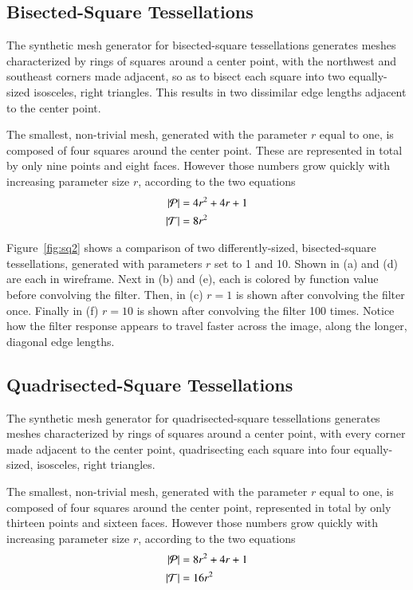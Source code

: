%
%
%
%
\pagebreak
\subsection{Bisected-Square Tessellations}
\label{ch6sSTDDssBST}
The synthetic mesh generator for bisected-square tessellations generates meshes characterized by rings of squares around a center point, with the northwest and southeast corners made adjacent, so as to bisect each square into two equally-sized isosceles, right triangles. This results in two dissimilar edge lengths adjacent to the center point.

The smallest, non-trivial mesh, generated with the parameter $r$ equal to one, is composed of four squares around the center point. These are represented in total by only nine points and eight faces. However those numbers grow quickly with increasing parameter size $r$, according to the two equations
\begin{align}
	|\mathcal{P}| &= 4r^2 + 4r + 1 \\
	|\mathcal{T}| &= 8r^2
	\label{eq:sq2PointAndFaceCounts}
\end{align}

Figure~\ref{fig:sq2} shows a comparison of two differently-sized, bisected-square tessellations, generated with parameters $r$ set to 1 and 10. Shown in (a) and (d) are each in wireframe. Next in (b) and (e), each is colored by function value before convolving the filter. Then, in (c) $r=1$ is shown after convolving the filter once. Finally in (f) $r=10$ is shown after convolving the filter 100 times. Notice how the filter response appears to travel faster across the image, along the longer, diagonal edge lengths.



%
%
%
%
\pagebreak
\subsection{Quadrisected-Square Tessellations}
\label{ch6sSTDDssQST}
The synthetic mesh generator for quadrisected-square tessellations generates meshes characterized by rings of squares around a center point, with every corner made adjacent to the center point, quadrisecting each square into four equally-sized, isosceles, right triangles.

The smallest, non-trivial mesh, generated with the parameter $r$ equal to one, is composed of four squares around the center point, represented in total by only thirteen points and sixteen faces. However those numbers grow quickly with increasing parameter size $r$, according to the two equations
\begin{align}
	|\mathcal{P}| &= 8r^2 + 4r + 1 \\
	|\mathcal{T}| &= 16r^2
	\label{eq:sq4PointAndFaceCounts}
\end{align}

